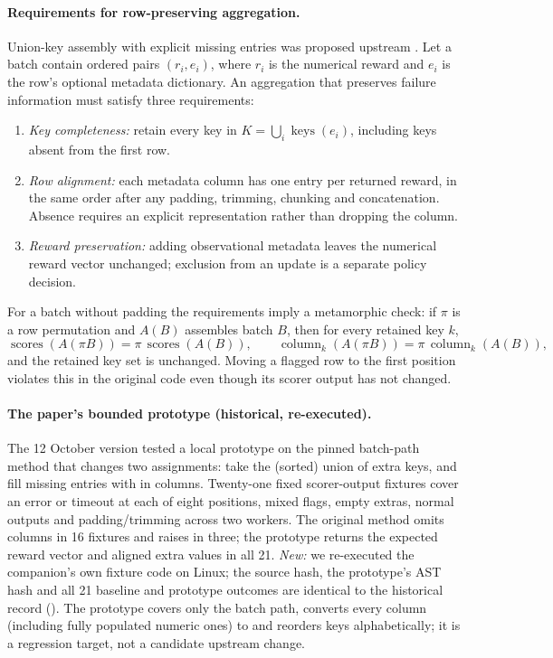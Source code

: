 \documentclass[11pt,a4paper]{article}
\begin{document}
\paragraph{Requirements for row-preserving aggregation.} Union-key assembly with explicit missing entries was proposed upstream \cite{verl6545,verl7151}. Let a batch contain ordered pairs $(r_i, e_i)$, where $r_i$ is the numerical reward and $e_i$ is the row's optional metadata dictionary. An aggregation that preserves failure information must satisfy three requirements:
\begin{enumerate}
\item \emph{Key completeness:} retain every key in $K=\bigcup_i \operatorname{keys}(e_i)$, including keys absent from the first row.
\item \emph{Row alignment:} each metadata column has one entry per returned reward, in the same order after any padding, trimming, chunking and concatenation. Absence requires an explicit representation rather than dropping the column.
\item \emph{Reward preservation:} adding observational metadata leaves the numerical reward vector unchanged; exclusion from an update is a separate policy decision.
\end{enumerate}
For a batch without padding the requirements imply a metamorphic check: if $\pi$ is a row permutation and $A(B)$ assembles batch $B$, then for every retained key $k$,
\[\operatorname{scores}(A(\pi B)) = \pi\,\operatorname{scores}(A(B)),\qquad \operatorname{column}_k(A(\pi B)) = \pi\,\operatorname{column}_k(A(B)),\]
and the retained key set is unchanged. Moving a flagged row to the first position violates this in the original code even though its scorer output has not changed.

\paragraph{The paper's bounded prototype (historical, re-executed).} The 12 October version tested a local prototype on the pinned batch-path method that changes two assignments: take the (sorted) union of extra keys, and fill missing entries with  in  columns. Twenty-one fixed scorer-output fixtures cover an error or timeout at each of eight positions, mixed flags, empty extras, normal outputs and padding/trimming across two workers. The original method omits columns in 16 fixtures and raises in three; the prototype returns the expected reward vector and aligned extra values in all 21. \emph{New:} we re-executed the companion's own fixture code on Linux; the source hash, the prototype's AST hash and all 21 baseline and prototype outcomes are identical to the historical record (). The prototype covers only the batch path, converts every column (including fully populated numeric ones) to  and reorders keys alphabetically; it is a regression target, not a candidate upstream change.
\end{document}
